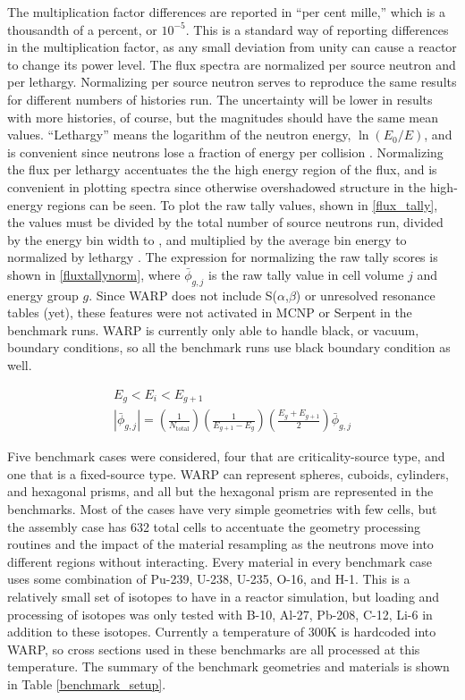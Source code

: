 The multiplication factor differences are reported in ``per cent mille,'' which is a thousandth of a percent, or $10^{-5}$.  This is a standard way of reporting differences in the multiplication factor, as any small deviation from unity can cause a reactor to change its power level.  The flux spectra are normalized per source neutron and per lethargy.  Normalizing per source neutron serves to reproduce the same results for different numbers of histories run.  The uncertainty will be lower in results with more histories, of course, but the magnitudes should have the same mean values.   ``Lethargy'' means the logarithm of the neutron energy, $\ln(E_0/E)$, and is convenient since neutrons lose a fraction of energy per collision \cite{duderstadt}.  Normalizing the flux per lethargy accentuates the the high energy region of the flux, and is convenient in plotting spectra since otherwise overshadowed structure in the high-energy regions can be seen.  To plot the raw tally values, shown in \eqref{flux_tally}, the values must be divided by the total number of source neutrons run, divided by the energy bin width to , and multiplied by the average bin energy to normalized by lethargy \cite{lethargyplot}.  The expression for normalizing the raw tally scores is shown in \eqref{fluxtallynorm}, where $\bar{\phi}_{g,j}$ is the raw tally value in cell volume $j$ and energy group $g$.  Since WARP does not include S($\alpha$,$\beta$) or unresolved resonance tables (yet), these features were not activated in MCNP or Serpent in the benchmark runs.  WARP is currently only able to handle black, or vacuum, boundary conditions, so all the benchmark runs use black boundary condition as well.

\begin{equation}
\label{fluxtallynorm}
\begin{gathered}
E_g < E_i < E_{g+1} \\
|\bar{\phi}_{g,j}| = \left( \frac{1}{N_\mathrm{total}}\right) \left(\frac{1}{E_{g+1}-E_g}\right) \left(\frac{E_g+E_{g+1}}{2} \right) \bar{\phi}_{g,j}
\end{gathered}
\end{equation}

Five benchmark cases were considered, four that are criticality-source type, and one that is a fixed-source type.  WARP can represent spheres, cuboids, cylinders, and hexagonal prisms, and all but the hexagonal prism are represented in the benchmarks.  Most of the cases have very simple geometries with few cells, but the assembly case has 632 total cells to accentuate the geometry processing routines and the impact of the material resampling as the neutrons move into different regions without interacting.  Every material in every benchmark case uses some combination of Pu-239, U-238, U-235, O-16, and H-1.  This is a relatively small set of isotopes to have in a reactor simulation, but loading and processing of isotopes was only tested with B-10, Al-27, Pb-208, C-12, Li-6 in addition to these isotopes.  Currently a temperature of 300K is hardcoded into WARP, so cross sections used in these benchmarks are all processed at this temperature.   The summary of the benchmark geometries and materials is shown in Table \ref{benchmark_setup}.  

